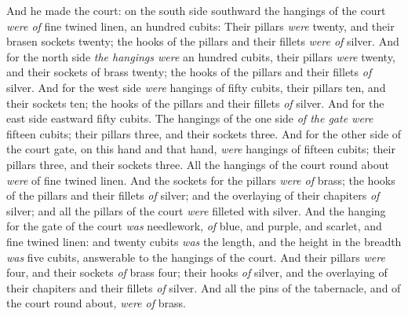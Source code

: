 \documentclass[11pt,letterpaper,oneside]{memoir}
\begin{document}
And he made the court: on the south side southward the hangings of the
court \emph{were of} fine twined linen, an hundred cubits: Their pillars
\emph{were} twenty, and their brasen sockets twenty; the hooks of the
pillars and their fillets \emph{were of} silver. And for the north side
\emph{the hangings were} an hundred cubits, their pillars \emph{were}
twenty, and their sockets of brass twenty; the hooks of the pillars and
their fillets \emph{of} silver. And for the west side \emph{were}
hangings of fifty cubits, their pillars ten, and their sockets ten; the
hooks of the pillars and their fillets \emph{of} silver. And for the
east side eastward fifty cubits. The hangings of the one side \emph{of
the gate were} fifteen cubits; their pillars three, and their sockets
three. And for the other side of the court gate, on this hand and that
hand, \emph{were} hangings of fifteen cubits; their pillars three, and
their sockets three. All the hangings of the court round about
\emph{were} of fine twined linen. And the sockets for the pillars
\emph{were of} brass; the hooks of the pillars and their fillets
\emph{of} silver; and the overlaying of their chapiters \emph{of}
silver; and all the pillars of the court \emph{were} filleted with
silver. And the hanging for the gate of the court \emph{was} needlework,
\emph{of} blue, and purple, and scarlet, and fine twined linen: and
twenty cubits \emph{was} the length, and the height in the breadth
\emph{was} five cubits, answerable to the hangings of the court. And
their pillars \emph{were} four, and their sockets \emph{of} brass four;
their hooks \emph{of} silver, and the overlaying of their chapiters and
their fillets \emph{of} silver. And all the pins of the tabernacle, and
of the court round about, \emph{were of} brass.
\end{document}
